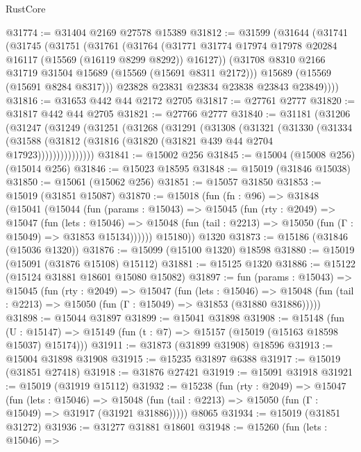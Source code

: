 \begin{lexlean}{RustCore}
\begin{coremodule}
@31774 := @31404 @2169 @27578 @15389
@31812 := @31599
    (@31644
      (@31741
        (@31745
          (@31751
            (@31761
              (@31764
                (@31771 @31774 @17974 @17978 @20284 @16117 (@15569 (@16119 @8299 @8292)) @16127))
              (@31708 @8310 @2166 @31719 @31504 @15689 (@15569 (@15691 @8311 @2172)))
              @15689
              (@15569 (@15691 @8284 @8317)))
            @23828
            @23831
            @23834
            @23838
            @23843
            @23849))))
@31816 := @31653 @442 @44 @2172 @2705
@31817 := @27761 @2777
@31820 := @31817 @442 @44 @2705
@31821 := @27766 @2777
@31840 := @31181
    (@31206
      (@31247
        (@31249
          (@31251
            (@31268
              (@31291
                (@31308
                  (@31321
                    (@31330
                      (@31334
                        (@31588 (@31812 (@31816 (@31820 (@31821 @439 @44 @2704 @17923)))))))))))))))
@31841 := @15002 @256
@31845 := @15004 (@15008 @256) (@15014 @256)
@31846 := @15023 @18595
@31848 := @15019 (@31846 @15038)
@31850 := @15061 (@15062 @256)
@31851 := @15057 @31850
@31853 := @15019 (@31851 @15087)
@31870 := @15018
    (fun (fn : @96) =>
    @31848
      (@15041
        (@15044
          (fun (params : @15043) =>
          @15045
            (fun (rty : @2049) =>
            @15047
              (fun (lets : @15046) =>
              @15048 (fun (tail : @2213) => @15050 (fun (Γ : @15049) => @31853 @15134))))))
        @15180))
    @1320
@31873 := @15186 (@31846 (@15036 @1320))
@31876 := @15099 (@15100 @1320) @18598
@31880 := @15019 (@15091 (@31876 @15108) @15112)
@31881 := @15125 @1320
@31886 := @15122 (@15124 @31881 @18601 @15080 @15082)
@31897 := fun (params : @15043) =>
  @15045
    (fun (rty : @2049) =>
    @15047
      (fun (lets : @15046) =>
      @15048 (fun (tail : @2213) => @15050 (fun (Γ : @15049) => @31853 (@31880 @31886)))))
@31898 := @15044 @31897
@31899 := @15041 @31898
@31908 := @15148
    (fun (U : @15147) => @15149 (fun (t : @7) => @15157 (@15019 (@15163 @18598 @15037) @15174)))
@31911 := @31873 (@31899 @31908) @18596
@31913 := @15004 @31898 @31908
@31915 := @15235 @31897 @6388
@31917 := @15019 (@31851 @27418)
@31918 := @31876 @27421
@31919 := @15091 @31918
@31921 := @15019 (@31919 @15112)
@31932 := @15238
    (fun (rty : @2049) =>
    @15047
      (fun (lets : @15046) =>
      @15048 (fun (tail : @2213) => @15050 (fun (Γ : @15049) => @31917 (@31921 @31886)))))
    @8065
@31934 := @15019 (@31851 @31272)
@31936 := @31277 @31881 @18601
@31948 := @15260
    (fun (lets : @15046) =>

\end{coremodule}
\end{lexlean}
